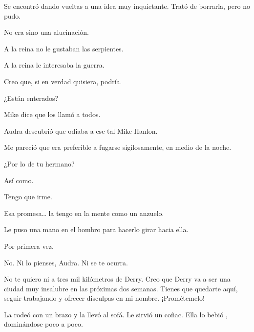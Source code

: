 \sk
Se encontró dando vueltas a una idea muy inquietante. Trató de borrarla, pero no pudo. 

\sk
No era sino una alucinación. 

\sk
A la reina no le gustaban las serpientes.\nb{}

\sk
A la reina le interesaba la guerra.\nb{}

\sk
 Creo que, si en verdad quisiera, podría. 

\sk
¿Están enterados? 

\sk
Mike dice que los llamó a todos. 

\sk
Audra descubrió que odiaba a ese tal Mike Hanlon. 

\sk
Me
pareció que era preferible a fugarse sigilosamente, en medio de la noche. 

\sk
¿Por lo de tu hermano? 

\sk
Así como. 

\sk
Tengo que irme. 

\sk
Esa promesa\ldots{} la tengo en la mente como un anzuelo. \nb{}

\sk
Le puso una mano en el hombro para hacerlo girar hacia ella. 

\sk
Por primera vez. 

\sk
No. Ni lo pienses, Audra. Ni se te ocurra. 

\sk
No te quiero ni a tres mil kilómetros de
Derry. Creo que Derry va a ser una ciudad muy
insalubre en las próximas dos semanas. Tienes que
quedarte aquí, seguir trabajando y ofrecer
disculpas en mi nombre. ¡Prométemelo!

\sk
La rodeó con un brazo y la llevó al sofá. Le
sirvió un coñac. Ella lo bebió ,
dominándose poco a poco.

